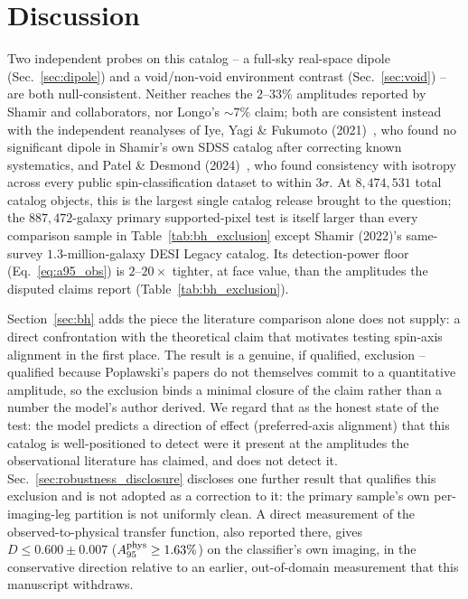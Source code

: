 \documentclass[twocolumn,linenumbers]{aastex702}
\begin{document}
\section{Discussion}
\label{sec:discussion}

Two independent probes on this catalog -- a full-sky real-space dipole
(Sec.~\ref{sec:dipole}) and a void/non-void environment contrast
(Sec.~\ref{sec:void}) -- are both null-consistent. Neither reaches the
$2$--$33\%$ amplitudes reported by Shamir and collaborators, nor
Longo's $\sim\!7\%$ claim; both are consistent instead with the independent
reanalyses of Iye, Yagi \& Fukumoto (2021)~\cite{Iye:2021}, who found no
significant dipole in Shamir's own SDSS catalog after correcting known
systematics, and Patel \& Desmond (2024)~\cite{Patel:2024}, who found
consistency with isotropy across every public spin-classification dataset to
within $3\sigma$. At $8{,}474{,}531$ total catalog objects, this is the largest single catalog
release brought to the question; the $887{,}472$-galaxy primary
supported-pixel test is itself larger than every comparison sample in
Table~\ref{tab:bh_exclusion} except Shamir (2022)'s same-survey $1.3$-million-galaxy
DESI Legacy catalog. Its detection-power floor (Eq.~\ref{eq:a95_obs}) is
$2$--$20\times$ tighter, at face value, than the amplitudes the disputed
claims report (Table~\ref{tab:bh_exclusion}).

Section~\ref{sec:bh} adds the piece the literature comparison alone does
not supply: a direct confrontation with the theoretical claim that motivates
testing spin-axis alignment in the first place. The result is a genuine,
if qualified, exclusion -- qualified because Poplawski's papers do not
themselves commit to a quantitative amplitude, so the exclusion binds a
minimal closure of the claim rather than a number the model's author
derived. We regard that as the honest state of the test: the model predicts
a direction of effect (preferred-axis alignment) that this catalog is
well-positioned to detect were it present at the amplitudes the
observational literature has claimed, and does not detect it.
Sec.~\ref{sec:robustness_disclosure} discloses one further result that
qualifies this exclusion and is not adopted as a correction to it: the
primary sample's own per-imaging-leg partition is not uniformly clean. A
direct measurement of the observed-to-physical transfer function, also
reported there, gives $D \le 0.600 \pm 0.007$
($A_{95}^{\rm phys} \ge 1.63\%$) on the classifier's own imaging, in the
conservative direction relative to an earlier, out-of-domain measurement
that this manuscript withdraws.
\end{document}
